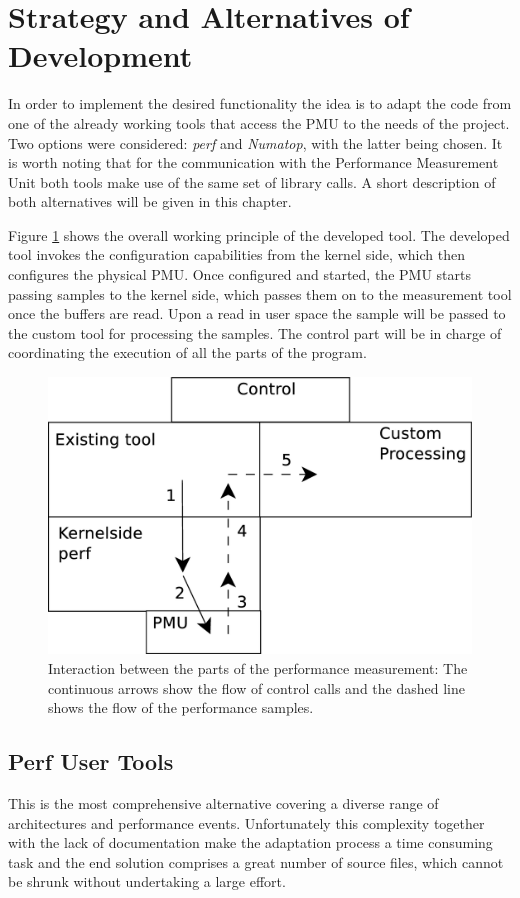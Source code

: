 \section{Strategy and Alternatives of Development}\label{section:strat}
In order to implement the desired functionality the idea is to adapt the code from one of the already working tools that access the PMU to the needs of the project. Two options were considered: \textit{perf} and \textit{Numatop}, with the latter being chosen. It is worth noting that for the communication with the Performance Measurement Unit both tools make use of the same set of library calls. A short description of both alternatives will be given in this chapter.

Figure \ref{fig:dstrategy} shows the overall working principle of the developed tool. The developed tool invokes the configuration capabilities from the kernel side, which then configures the physical PMU. Once configured and started, the PMU starts passing samples to the kernel side, which passes them on to the measurement tool once the buffers are read. Upon a read in user space the sample will be passed to the custom tool for processing the samples. The control part will be in charge of coordinating the execution of all the parts of the program.

\begin{figure}[ht]
	\centering
		\includegraphics[width=.6\textwidth]{figures/dev-strategy.eps}
		\caption[Flow of information in the development]{Interaction between the parts of the performance measurement: The continuous arrows show the flow of control calls and the dashed line shows the flow of the performance samples.}
		\label{fig:dstrategy}
\end{figure}
\subsection{Perf User Tools}\label{section:perf-ut}

This is the most comprehensive alternative covering a diverse range of architectures and performance events. Unfortunately this complexity together with the lack of documentation make the adaptation process a time consuming task and the end solution comprises a great number of source files, which cannot be shrunk without undertaking a large effort. 

